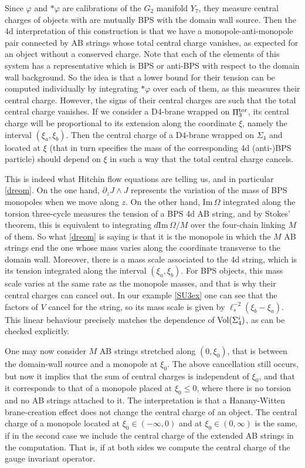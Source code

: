 \documentclass[11pt]{article}
\def\im{\mbox{Im}\, }
\def\p {{\partial}}
\begin{document}
Since $\varphi$ and $*\varphi$ are calibrations of the $G_2$ manifold $Y_7$,  they measure central charges of objects with are mutually BPS with the domain wall source. Then the 4d interpretation of this construction is that we have a monopole-anti-monopole pair connected by AB strings whose total central charge vanishes, as expected for an object without a conserved charge. Note that each of the elements of this system has a representative which is BPS or anti-BPS with respect to the domain wall background. So the idea is that a lower bound for their tension can be computed individually by integrating $*\varphi$ over each of them, as this measures their central charge. However, the signs of their central charges are such that the total central charge vanishes. If we consider a D4-brane wrapped on $\Pi_3^{\rm tor}$, its central charge will be proportional to its extension along the coordinate $\xi$, namely the interval $(\xi_a, \xi_b)$. Then the central charge of a D4-brane wrapped on $\Sigma_4$ and located at $\xi$ (that in turn specifies the mass of the corresponding 4d (anti-)BPS particle) should depend on $\xi$ in such a way that the total central charge cancels. 

This is indeed what Hitchin flow equations are telling us, and in particular \eqref{dreom}. On the one hand, $\p_z J \wedge J$ represents the variation of the  mass of BPS monopoles  when we move along $z$. On the other hand, ${\im \Omega}$ integrated along the torsion three-cycle measures the tension of a BPS 4d AB string, and by Stokes' theorem, this is equivalent to integrating ${d \im \Omega/M}$ over the four-chain linking $M$ of them. So what \eqref{dreom} is saying is that it is the monopole in which the $M$ AB strings end the one whose mass varies along the coordinate transverse to the domain wall. Moreover, there is a mass scale associated to the 4d string, which is its tension integrated along the interval $(\xi_a, \xi_b)$. For BPS objects, this mass scale varies at the same rate as the monopole masses, and that is why their central charges can cancel out. In our example \eqref{SU3ex} one can see that the factors of $V$ cancel for the string, so its mass scale is given by $\ell_s^{-2}(\xi_b-\xi_a)$. This linear behaviour precisely matches the dependence of ${\rm Vol}(\Sigma_4^i)$, as can be checked explicitly. 

One may now consider $M$ AB strings stretched along $(0, \xi_0)$, that is between the domain-wall source and a monopole at $\xi_0$. The above cancellation still occurs, but now it implies that the sum of central charges is independent of $\xi_0$, and that it corresponds to that of a monopole placed at $\xi_0 \leq 0$, where there is no torsion and no AB strings attached to it. The interpretation is that a Hanany-Witten brane-creation effect does not change the central charge of an object. The central charge of a monopole located at $\xi_0 \in (-\infty, 0)$ and at $\xi_0 \in (0,\infty)$ is the same, if in the second case we include the central charge of the extended AB strings in the computation. That is, if at both sides we compute the central charge of the gauge invariant operator. 
\end{document}
